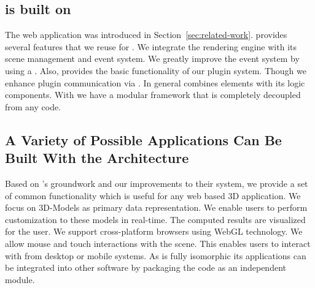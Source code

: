\documentclass[../../ClassicThesis.tex]{subfiles}
\begin{document}


\subsection{{\convertify} is built on {\brickify}}
\label{sec:brickify-comparison}

The web application {\brickify} was introduced in
Section~\ref{sec:related-work}. {\brickify} provides several
features that we reuse for {\convertify}. We integrate the
rendering engine with its scene management and event system.
We greatly improve the event system by using a
. Also, {\brickify} provides the basic
functionality of our plugin system. Though we enhance plugin
communication via . In general {\brickify}
combines {\userinterface} elements with its logic
components. With {\convertify} we have a modular framework
that is completely decoupled from any {\userinterface} code.

\subsection{A Variety of Possible Applications Can Be Built With the {\convertify} Architecture}
\label{sec:variety-of-applications}

Based on {\brickify}'s groundwork and our improvements to
their system, we provide a set of common functionality which
is useful for any web based 3D application. We focus on
3D-Models as primary data representation. We enable users to
perform customization to these models in real-time. The
computed results are visualized for the user. We support
cross-platform browsers using WebGL technology. We allow
mouse and touch interactions with the scene. This enables
users to interact with {\convertify} from desktop or mobile
systems. As {\convertify} is fully isomorphic its
applications can be integrated into other software by
packaging the code as an independent {\nodejs} module.
\end{document}
